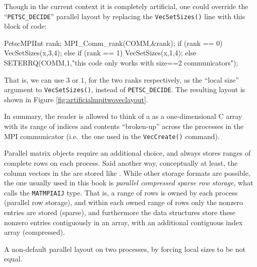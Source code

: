 Though in the current context it is completely artificial, one could override the ``\texttt{PETSC\_DECIDE}'' parallel layout by replacing the \texttt{VecSetSizes()} line with this block of code:
\begin{code}
PetscMPIInt rank;
MPI_Comm_rank(COMM,&rank);
if (rank == 0) {
  VecSetSizes(x,3,4);
} else if (rank == 1) {
  VecSetSizes(x,1,4);
} else {
  SETERRQ(COMM,1,"this code only works with size==2 communicators");
}
\end{code}
That is, we can use $3$ or $1$, for the two ranks respectively, as the ``local size'' argument to \texttt{VecSetSizes()}, instead of \texttt{PETSC\_DECIDE}.  The resulting layout is shown in Figure \ref{fig:artificialmpitwoveclayout}.

In summary, the reader is allowed to think of a \PETSc \pVec as a one-dimensional C array with its range of indices and contents ``broken-up'' across the processes in the MPI communicator (i.e.~the one used in the \texttt{VecCreate()} command).

Parallel matrix objects \pMat require an additional choice, and \PETSc always stores ranges of complete rows on each process.  Said another way, conceptually at least, the column vectors in the \pMat are stored like \pVecs.  While other storage formats are possible, the one usually used in this book is \emph{parallel compressed sparse row storage}, what \PETSc calls the \texttt{MATMPIAIJ} type.  That is, a range of rows is owned by each process (parallel row storage), and within each owned range of rows only the nonzero entries are stored (sparse), and furthermore the data structures store these nonzero entries contiguously in an array, with an additional contiguous index array (compressed).

\begin{marginfigure}
\bigskip
\caption{A non-default parallel \pVec layout on two processes, by forcing local sizes to be not equal.}
\label{fig:artificialmpitwoveclayout}
\end{marginfigure}

